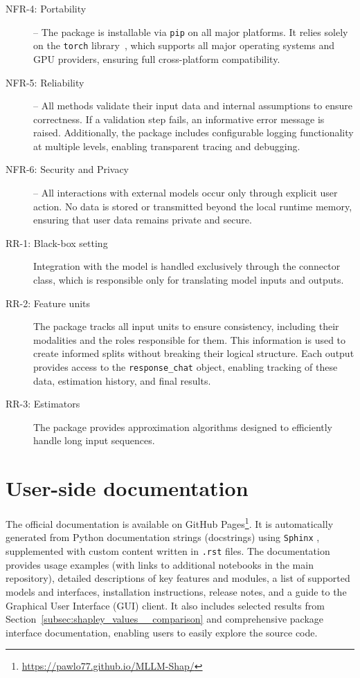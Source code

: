 \begin{appendices}
\begin{description}
    \item[NFR-4: Portability] -- The package is installable via \texttt{pip} on all major platforms. It relies solely on the \texttt{torch} library~\parencite{paszke2019pytorch}, which supports all major operating systems and GPU providers, ensuring full cross-platform compatibility.

    \item[NFR-5: Reliability] -- All methods validate their input data and internal assumptions to ensure correctness. If a validation step fails, an informative error message is raised. Additionally, the package includes configurable logging functionality at multiple levels, enabling transparent tracing and debugging.

    \item[NFR-6: Security and Privacy] -- All interactions with external models occur only through explicit user action. No data is stored or transmitted beyond the local runtime memory, ensuring that user data remains private and secure.

    \item[RR-1: Black-box setting] Integration with the model is handled exclusively through the connector class, which is responsible only for translating model inputs and outputs.

    \item[RR-2: Feature units] The package tracks all input units to ensure consistency, including their modalities and the roles responsible for them. This information is used to create informed splits without breaking their logical structure. Each output provides access to the \texttt{response\_chat} object, enabling tracking of these data, estimation history, and final results.

    \item[RR-3: Estimators] The package provides approximation algorithms designed to efficiently handle long input sequences.
\end{description}

\section{User-side documentation}
\label{sec:package__docs}

The official documentation is available on GitHub Pages\footnote{\url{https://pawlo77.github.io/MLLM-Shap/}}. It is automatically generated from Python documentation strings (docstrings) using \texttt{Sphinx} \parencite{sphinx}, supplemented with custom content written in \texttt{.rst} files. The documentation provides usage examples (with links to additional notebooks in the main repository), detailed descriptions of key features and modules, a list of supported models and interfaces, installation instructions, release notes, and a guide to the Graphical User Interface (GUI) client. It also includes selected results from Section~\ref{subsec:shapley_values__comparison} and comprehensive package interface documentation, enabling users to easily explore the source code.


\end{appendices}
